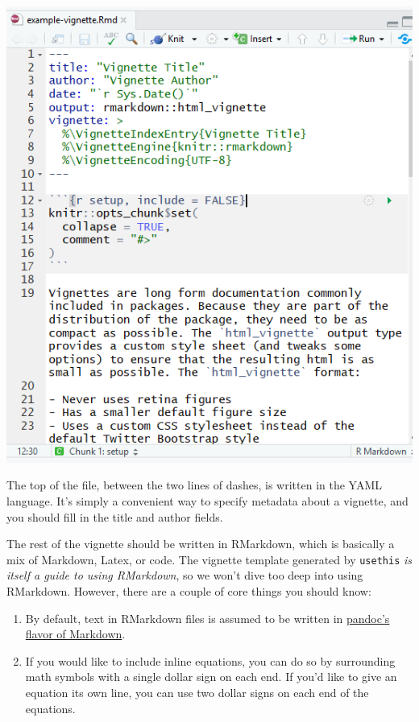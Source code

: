 \documentclass[
]{book}
\providecommand{\tightlist}{%
  \setlength{\itemsep}{0pt}\setlength{\parskip}{0pt}}
\begin{document}
\includegraphics{images/packageSS/vignette1.PNG}

The top of the file, between the two lines of dashes, is written in the YAML language. It's simply a convenient way to specify metadata about a vignette, and you should fill in the title and author fields.

The rest of the vignette should be written in RMarkdown, which is basically a mix of Markdown, Latex, or code. The vignette template generated by \texttt{usethis} \emph{is itself a guide to using RMarkdown}, so we won't dive too deep into using RMarkdown. However, there are a couple of core things you should know:

\begin{enumerate}
\def\labelenumi{\arabic{enumi}.}
\tightlist
\item
  By default, text in RMarkdown files is assumed to be written in \href{http://pandoc.org/MANUAL.html}{pandoc's flavor of Markdown}.
\item
  If you would like to include inline equations, you can do so by surrounding math symbols with a single dollar sign on each end. If you'd like to give an equation its own line, you can use two dollar signs on each end of the equations.
\end{enumerate}
\end{document}
